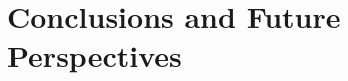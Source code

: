 \documentclass[11pt, a4paper]{report}
\newcommand{\importsection}[1]{}
\begin{document}
\chapter{Conclusions and Future Perspectives}
\label{ch:conclusions}
\importsection{conclusions}

\cleardoublepage
{}
{}
{\fontsize{9pt}{11pt}\selectfont
\setlength{\bibsep}{0pt}

}

\cleardoublepage
\appendix
\importsection{appendix_a}
\importsection{appendix_b}
\importsection{appendix_c}
\importsection{appendix_d}
\importsection{appendix_e}
\importsection{appendix_f}
\importsection{appendix_g}
\importsection{appendix_h}
\end{document}
